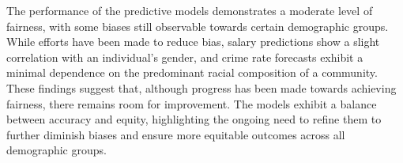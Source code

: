 The performance of the predictive models demonstrates a moderate level of fairness, with some biases still observable towards certain demographic groups. While efforts have been made to reduce bias, salary predictions show a slight correlation with an individual's gender, and crime rate forecasts exhibit a minimal dependence on the predominant racial composition of a community. These findings suggest that, although progress has been made towards achieving fairness, there remains room for improvement. The models exhibit a balance between accuracy and equity, highlighting the ongoing need to refine them to further diminish biases and ensure more equitable outcomes across all demographic groups.